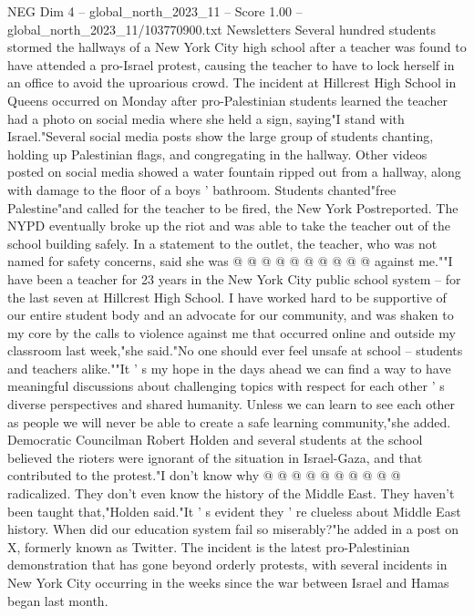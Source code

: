 \begin{textsample}{NEG Dim 4 – global\_north\_2023\_11 – Score 1.00 – global\_north\_2023\_11/103770900.txt}  \label{ex:f4_neg_260}
Newsletters Several hundred students stormed the hallways of a New York City high school after a teacher was found to have attended a pro-Israel protest, causing the teacher to have to lock herself in an office to avoid the uproarious crowd.
The incident at Hillcrest High School in Queens occurred on Monday after pro-Palestinian students learned the teacher had a photo on social media where she held a sign, saying"I stand with Israel."Several social media posts show the large group of students chanting, holding up Palestinian flags, and congregating in the hallway.
Other videos posted on social media showed a water fountain ripped out from a hallway, along with damage to the floor of a boys ' bathroom.
Students chanted"free Palestine"and called for the teacher to be fired, the New York Postreported.
The NYPD eventually broke up the riot and was able to take the teacher out of the school building safely.
In a statement to the outlet, the teacher, who was not named for safety concerns, said she was @ @ @ @ @ @ @ @ @ @ against me.""I have been a teacher for 23 years in the New York City public school system -- for the last seven at Hillcrest High School.
I have worked hard to be supportive of our entire student body and an advocate for our community, and was shaken to my core by the calls to violence against me that occurred online and outside my classroom last week,"she said."No one should ever feel unsafe at school -- students and teachers alike.""It ' s my hope in the days ahead we can find a way to have meaningful discussions about challenging topics with respect for each other ' s diverse perspectives and shared humanity.
Unless we can learn to see each other as people we will never be able to create a safe learning community,"she added.
Democratic Councilman Robert Holden and several students at the school believed the rioters were ignorant of the situation in Israel-Gaza, and that contributed to the protest."I don't know why @ @ @ @ @ @ @ @ @ @ radicalized.
They don't even know the history of the Middle East.
They haven't been taught that,"Holden said."It ' s evident they ' re clueless about Middle East history.
When did our education system fail so miserably?"he added in a post on X, formerly known as Twitter.
The incident is the latest pro-Palestinian demonstration that has gone beyond orderly protests, with several incidents in New York City occurring in the weeks since the war between Israel and Hamas began last month.

\end{textsample}
